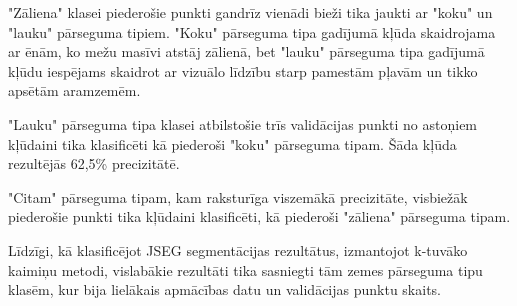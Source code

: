 \documentclass[12pt,paper=a4]{report}
\begin{document}
"Zāliena" klasei piederošie punkti gandrīz vienādi bieži tika jaukti ar "koku" un "lauku" pārseguma tipiem. "Koku" pārseguma tipa gadījumā kļūda skaidrojama ar ēnām, ko mežu masīvi atstāj zālienā, bet "lauku" pārseguma tipa gadījumā kļūdu iespējams skaidrot ar vizuālo līdzību starp pamestām pļavām un tikko apsētām aramzemēm. \par
"Lauku" pārseguma tipa klasei atbilstošie trīs validācijas punkti no astoņiem kļūdaini tika klasificēti kā piederoši "koku" pārseguma tipam. Šāda kļūda rezultējās 62,5\% precizitātē.\par
"Citam" pārseguma tipam, kam raksturīga viszemākā precizitāte, visbiežāk piederošie punkti tika kļūdaini klasificēti, kā piederoši "zāliena" pārseguma tipam.\par
Līdzīgi, kā klasificējot JSEG segmentācijas rezultātus, izmantojot k-tuvāko kaimiņu metodi, vislabākie rezultāti tika sasniegti tām zemes pārseguma tipu klasēm, kur bija lielākais apmācības datu un validācijas punktu skaits.
\end{document}
